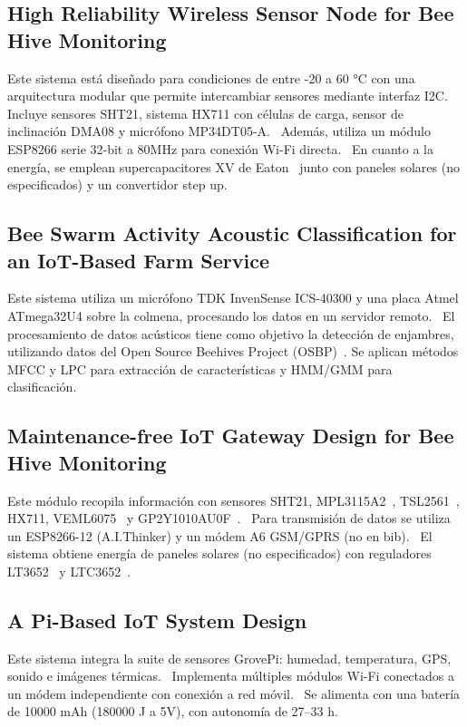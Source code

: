 \subsection{High Reliability Wireless Sensor Node for Bee Hive Monitoring}
Este sistema está diseñado para condiciones de entre -20 a 60 °C con una arquitectura modular que permite intercambiar sensores mediante interfaz I2C.~\cite{vidrascu_svasta_vladescu_2016}  
Incluye sensores SHT21, sistema HX711 con células de carga, sensor de inclinación DMA08 y micrófono MP34DT05-A.~\cite{vidrascu_svasta_vladescu_2016}  
Además, utiliza un módulo ESP8266 serie 32-bit a 80MHz para conexión Wi-Fi directa.~\cite{vidrascu_svasta_vladescu_2016}  
En cuanto a la energía, se emplean supercapacitores XV de Eaton~\cite{supercapacitor_xv_eaton} junto con paneles solares (no especificados) y un convertidor step up.~\cite{vidrascu_svasta_vladescu_2016}

\subsection{Bee Swarm Activity Acoustic Classification for an IoT-Based Farm Service}
Este sistema utiliza un micrófono TDK InvenSense ICS-40300 y una placa Atmel ATmega32U4 sobre la colmena, procesando los datos en un servidor remoto.~\cite{zgank_2019}  
El procesamiento de datos acústicos tiene como objetivo la detección de enjambres, utilizando datos del Open Source Beehives Project (OSBP)~\cite{open_source_beehives_project_iaac}. Se aplican métodos MFCC y LPC para extracción de características y HMM/GMM para clasificación.~\cite{zgank_2019}

\subsection{Maintenance-free IoT Gateway Design for Bee Hive Monitoring}
Este módulo recopila información con sensores SHT21, MPL3115A2~\cite{nxp_mpl3115a2}, TSL2561~\cite{tsl2561_adafruit}, HX711, VEML6075~\cite{adafruit_veml6075} y GP2Y1010AU0F~\cite{vidrascu_svasta_2017b}.~\cite{vidrascu_svasta_2017b}  
Para transmisión de datos se utiliza un ESP8266-12 (A.I.Thinker) y un módem A6 GSM/GPRS (no en bib).~\cite{vidrascu_svasta_2017b}  
El sistema obtiene energía de paneles solares (no especificados) con reguladores LT3652~\cite{lt3652_datasheet} y LTC3652~\cite{ltc3652_datasheet}.~\cite{vidrascu_svasta_2017b}

\subsection{A Pi-Based IoT System Design}
Este sistema integra la suite de sensores GrovePi: humedad, temperatura, GPS, sonido e imágenes térmicas.~\cite{chen_chien_hsu_jing_lin_lin_2020}  
Implementa múltiples módulos Wi-Fi conectados a un módem independiente con conexión a red móvil.~\cite{chen_chien_hsu_jing_lin_lin_2020}  
Se alimenta con una batería de 10000 mAh (180000 J a 5V), con autonomía de 27–33 h.~\cite{chen_chien_hsu_jing_lin_lin_2020}

